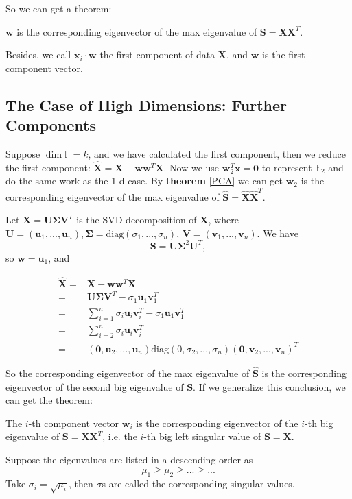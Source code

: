 	 So we can get a theorem:
	\begin{theorem}\label{PCA}  $\mathbf w$ is the corresponding eigenvector of the max eigenvalue of $\mathbf S=\mathbf X\mathbf X^T$.
	\end{theorem}
	
	Besides, we call $\mathbf x_i\cdot \mathbf w$ the first component of data $\mathbf X$, and $\mathbf w$ is the first component vector.

\subsection{The Case of High Dimensions: Further Components}
	Suppose $\dim \mathbb F = k$, and we have calculated the first component, then we reduce the first component: $\hat{\mathbf X}=\mathbf X - \mathbf w\mathbf w^T\mathbf X$. Now we use  $\mathbf w_{2}^T\mathbf x = \bm 0$ to represent $\mathbb F_2$ and do the same work as the 1-d case.
	By \textbf{theorem} \ref{PCA} we can get $\mathbf w_2$ is the corresponding eigenvector of the max eigenvalue of $\hat{\mathbf S}=\hat{\mathbf X}\hat{\mathbf X}^T$.
	
	Let $\mathbf X = \mathbf U \bm \Sigma \mathbf V^T$ is the SVD decomposition of $\mathbf X$, where $\mathbf U=(\mathbf u_1,...,\mathbf u_n), \bm \Sigma = \text{diag}(\sigma_1,...,\sigma_n)$, $\mathbf  V=(\mathbf v_1,...,\mathbf v_n)$. We have
	$$\mathbf S = \mathbf U \bm \Sigma^2\mathbf U^T,$$ so $\mathbf w =\mathbf u_1$, and
	
	 \begin{align*}\hat{\mathbf X} =& \mathbf X - \mathbf w\mathbf w^T\mathbf X\\
	 =&\mathbf U \bm \Sigma \mathbf V^T-\sigma_1 \mathbf u_1\mathbf v_1^T\\
	 =&\sum_{i=1}^n \sigma_i \mathbf u_i\mathbf v_i^T-\sigma_1 \mathbf u_1\mathbf v_1^T\\
	 =&\sum_{i=2}^n \sigma_i \mathbf u_i\mathbf v_i^T\\
	 =&(\bm 0,\mathbf u_2,...,\mathbf u_n)\text{diag} (0,\sigma_2,...,\sigma_n)(\bm 0,\mathbf v_2,...,\mathbf v_n)^T
	 \end{align*}
	 
	 So the corresponding eigenvector of the max eigenvalue of $\hat{\mathbf S}$ is the corresponding eigenvector of the second big eigenvalue of $\mathbf S$. If we generalize this conclusion, we can get the theorem:
	\begin{theorem} 
	 	The $i$-th component vector $\mathbf w_i$ is the corresponding eigenvector of the $i$-th big eigenvalue of $\mathbf S=\mathbf X\mathbf X^T$, i.e. the $i$-th big left singular value of $\mathbf S=\mathbf X$.
	\end{theorem}
	\begin{remark}
	Suppose the eigenvalues are listed in a descending order as $$\mu_1\geq \mu_2\geq ...\geq...$$ Take $\sigma_i=\sqrt{\mu_i}$, then $\sigma$s are called the corresponding  singular values.
	\end{remark}


